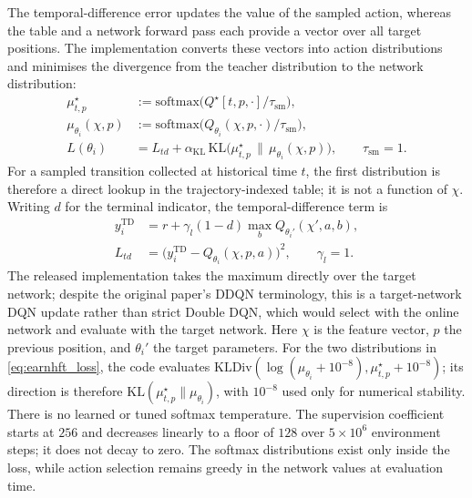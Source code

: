 The temporal-difference error updates the value of the sampled action, whereas the table and a network forward pass each provide a vector over all target positions. The implementation converts these vectors into action distributions and minimises the divergence from the teacher distribution to the network distribution:
\begin{equation}
\label{eq:earnhft_loss}
\begin{aligned}
\mu^\star_{t,p}&:=\mathrm{softmax}\bigl(Q^\star[t,p,\cdot]/\tau_{\mathrm{sm}}\bigr),\\
\mu_{\theta_i}(\chi,p)&:=\mathrm{softmax}\bigl(Q_{\theta_i}(\chi,p,\cdot)/\tau_{\mathrm{sm}}\bigr),\\
L(\theta_i)&=L_{td}+\alpha_{\mathrm{KL}}\,
\mathrm{KL}\bigl(\mu^\star_{t,p}\,\|\,\mu_{\theta_i}(\chi,p)\bigr),
\qquad \tau_{\mathrm{sm}}=1.
\end{aligned}
\end{equation}
For a sampled transition collected at historical time $t$, the first distribution is therefore a direct lookup in the trajectory-indexed table; it is not a function of $\chi$. Writing $d$ for the terminal indicator, the temporal-difference term is
\[
\begin{aligned}
y_i^{\mathrm{TD}}&=r+\gamma_l(1-d)\max_b Q_{\theta_i'}(\chi',a,b),\\
L_{td}&=\bigl(y_i^{\mathrm{TD}}-Q_{\theta_i}(\chi,p,a)\bigr)^2,
\qquad \gamma_l=1.
\end{aligned}
\]
The released implementation takes the maximum directly over the target network; despite the original paper's DDQN terminology, this is a target-network DQN update rather than strict Double DQN, which would select with the online network and evaluate with the target network. Here $\chi$ is the feature vector, $p$ the previous position, and $\theta_i'$ the target parameters. For the two distributions in \eqref{eq:earnhft_loss}, the code evaluates $\mathrm{KLDiv}(\log(\mu_{\theta_i}+10^{-8}),\mu^\star_{t,p}+10^{-8})$; its direction is therefore $\mathrm{KL}(\mu^\star_{t,p}\|\mu_{\theta_i})$, with $10^{-8}$ used only for numerical stability. There is no learned or tuned softmax temperature. The supervision coefficient starts at $256$ and decreases linearly to a floor of $128$ over $5\times10^6$ environment steps; it does not decay to zero. The softmax distributions exist only inside the loss, while action selection remains greedy in the network values at evaluation time.

